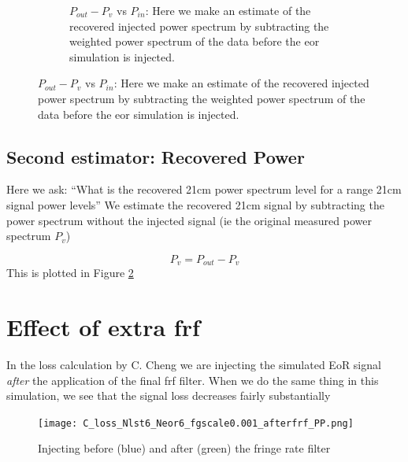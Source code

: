 \documentclass{article}
\begin{document}
\begin{figure}[bth]
\begin{center}
\begin{subfigure}{0.45\textwidth}
     \caption{$P_{out}-P_v$ vs $P_{in}$: Here we make an estimate of the recovered injected power spectrum by    subtracting the weighted power spectrum of the data before the eor simulation is injected.}\label{fig:eorvin}
   \end{subfigure}
\end{center}
\end{figure}
\subsection*{Second estimator: Recovered Power} 
Here we ask: ``What is the recovered 21cm power spectrum level for a range 21cm signal power levels''  We estimate the recovered 21cm signal by subtracting the power spectrum without the injected signal (ie the original measured power spectrum $P_{v}$)

\begin{equation}
P_{v} = P_{out} - P_v
\end{equation}
This is plotted in Figure \ref{fig:eorvin}  






\section*{Effect of extra frf}
In the loss calculation by C. Cheng we are injecting the simulated EoR signal \emph{after} the application of the final frf filter. When we do the same thing in this simulation, we see that the signal loss decreases fairly substantially
\begin{figure}[htb]
\centering
\texttt{[image: C\_loss\_Nlst6\_Neor6\_fgscale0.001\_afterfrf\_PP.png]}
\caption{Injecting before (blue) and after (green) the fringe rate filter}\label{fig:afterfrf}
\end{figure}
\end{document}
